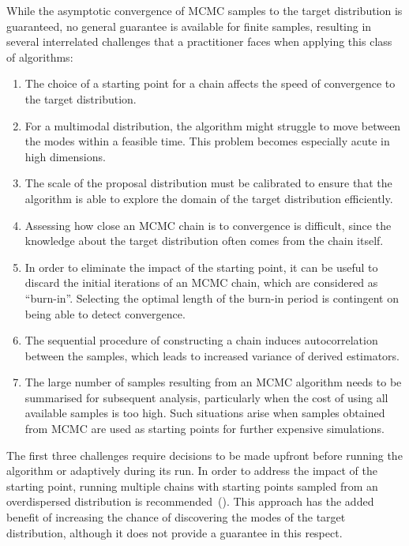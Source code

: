 \documentclass[11pt,a4paper]{report}
\begin{document}
While the asymptotic convergence of MCMC samples to the target distribution is guaranteed, no general guarantee is available for finite samples, resulting in several interrelated challenges that a practitioner faces when applying this class of algorithms:
\begin{enumerate}
\item The choice of a starting point for a chain affects the speed of convergence to the target distribution.
\item For a multimodal distribution, the algorithm might struggle to move between the modes within a feasible time. This problem becomes especially acute in high dimensions.
\item The scale of the proposal distribution must be calibrated to ensure that the algorithm is able to explore the domain of the target distribution efficiently.
\item Assessing how close an MCMC chain is to convergence is difficult, since the knowledge about the target distribution often comes from the chain itself.
\item In order to eliminate the impact of the starting point, it can be useful to discard the initial iterations of an MCMC chain, which are considered as ``burn-in''. Selecting the optimal length of the burn-in period is contingent on being able to detect convergence.
\item The sequential procedure of constructing a chain induces autocorrelation between the samples, which leads to increased variance of derived estimators.
\item The large number of samples resulting from an MCMC algorithm needs to be summarised for subsequent analysis, particularly when the cost of using all available samples is too high. Such situations arise when samples obtained from MCMC are used as starting points for further expensive simulations.
\end{enumerate}

The first three challenges require decisions to be made upfront before running the algorithm or adaptively during its run. In order to address the impact of the starting point, running multiple chains with starting points sampled from an overdispersed distribution is recommended~(\cite{gelmanInferenceIterativeSimulation1992}). This approach has the added benefit of increasing the chance of discovering the modes of the target distribution, although it does not provide a guarantee in this respect. 
\end{document}
